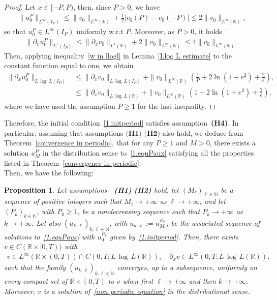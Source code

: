 \documentclass[11pt]{amsart}
\newtheorem{proposition}{Proposition}
\newcommand{\pa}{\partial}
\newcommand{\R}{\mathbb{R}}
\newcommand{\N}{\mathbb{N}}
\begin{document}
\begin{proof}
Let $x \in [-P,P)$, then, since $P>0$, we have
\begin{align}\label{estimationLinP}
    \|u^P_0\|_{L^\infty(I_P)}\leq \|v_0\|_{L^\infty(\R)} + \frac12 \left|v_0(P)-v_0(-P)\right|\leq 2\|v_0\|_{L^\infty(\R)},
\end{align}
so that $u^P_0 \in L^\infty(I_P)$ uniformly w.r.t $P$. Moreover, as $P>0$, it holds
\begin{align}\label{estimationL1P}
    \|\pa_x u^P_0\|_{L^1(I_P)} \leq \|\pa_x v_0\|_{L^1(\R)} + 2\|v_0\|_{L^\infty(\R)} \le  4\|v_0\|_{L^\infty(\R)}. 
\end{align}
Then, applying inequality~\eqref{w in llogl} in Lemma~\ref{Llog L estimate} to the constant function equal to one, we obtain
\begin{align}\label{estimationLlogLP}
    \|\pa_x u^P_0\|_{L\,\log\,L(I_P)} 
    &\leq  \|\pa_x v_0\|_{L\,\log\,L(I_P)} + \|v_0\|_{L^\infty(\R)} 
    \left(\frac{1}{P}+ 2\ln(1+e^2)+\frac{2}{e}\right), \\
    & \leq \|\pa_x v_0\|_{L\,\log\,L(\R)} + \|v_0\|_{L^\infty(\R)} 
    \left(1+ 2\ln(1+e^2)+\frac{2}{e}\right),
\end{align}
where we have used the assumption $P\ge 1$ for the last inequality. 
\end{proof}

Therefore, the initial condition~\eqref{1.initperiod} satisfies assumption~\textbf{(H4)}. In particular, assuming that assumptions $\textbf{(H1)}$-$\textbf{(H2)}$ also hold, we deduce from Theorem~\ref{convergence in periodic}, that for any $P\geq 1$ and $M>0$, there exists a solution $u^P_M$ in the distribution sense to~\eqref{1.equPaux} satisfying all the properties listed in Theorem~\ref{convergence in periodic}.\\
 
 Then, we have the following: 

\begin{proposition}\label{prop.PMinfty}
    Let assumptions~~\textbf{\emph{(H1)}}-\textbf{\emph{(H2)}} hold, let $(M_\ell)_{\ell \in \N}$ be a sequence of positive integers such that $M_\ell \to+\infty$ as $\ell\to+\infty$, and let $(P_k)_{k\in\N}$, with $P_0\geq 1$, be a nondecreasing sequence such that $P_k \to +\infty$ as $k\to+\infty$. Let also $(u_{k,\ell})_{k,\ell \in \N}$, with $u_{k,\ell} :=u^{P_k}_{M_\ell}$, be the associated sequence of solutions to~\eqref{1.equPaux} with $u^{P_k}_0$ given by~\eqref{1.initperiod}. Then, there exists $v \in C(\R \times [0,T))$ with
    \begin{align*}
        v \in L^\infty(\R \times (0,T)) \cap C(0,T;L\,\log\,L(\R)), \quad \pa_x v \in L^\infty(0,T;L\,\log\,L(\R)),
    \end{align*}
    such that the family $(u_{k,\ell})_{k,\ell \in\N}$ converges, up to a subsequence, uniformly on every compact set of $\R \times(0,T)$ to $v$ when first $\ell\to+\infty$ and then $k\to+\infty$. Moreover, $v$ is a solution of~\eqref{non periodic equation} in the distributional sense. 
\end{proposition}
\end{document}
